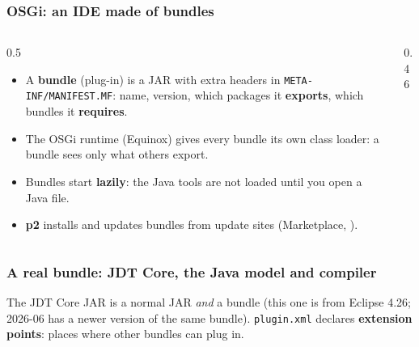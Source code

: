 \documentclass[aspectratio=169,10pt,compress]{beamer}
\begin{document}
\begin{frame}[t,fragile] \frametitle{OSGi: an IDE made of bundles}
  \begin{columns}[T]
    \begin{column}{0.5\textwidth}
      \begin{itemize}\small
        \item A \textbf{bundle} (plug-in) is a JAR with extra headers in \texttt{META-INF/MANIFEST.MF}: name, version,
              which packages it \textbf{exports}, which bundles it \textbf{requires}.
        \item The OSGi runtime (Equinox) gives every bundle its own class loader: a bundle sees only what others export.
        \item Bundles start \textbf{lazily}: the Java tools are not loaded until you open a Java file.
        \item \textbf{p2} installs and updates bundles from update sites (Marketplace, ).
      \end{itemize}
    \end{column}
    \begin{column}{0.46\textwidth}
      \begin{center}
      \end{center}
    \end{column}
  \end{columns}
\end{frame}




\begin{frame}[t,fragile] \frametitle{A real bundle: JDT Core, the Java model and compiler}

  \vspace{0.1em}
  \small
  The JDT Core JAR is a normal JAR \emph{and} a bundle (this one is from Eclipse 4.26; 2026-06 has a newer version of the same bundle).
  \texttt{plugin.xml} declares \textbf{extension points}: places where other bundles can plug in.
\end{frame}
\end{document}
